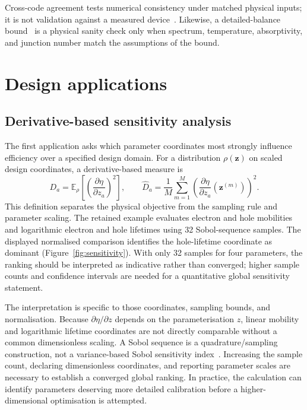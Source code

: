 
Cross-code agreement tests numerical consistency under matched physical
inputs; it is not validation against a measured
device~\cite{oberkampf2002}. Likewise, a
detailed-balance bound~\cite{shockley1961} is a physical sanity check only
when spectrum, temperature, absorptivity, and junction number match the
assumptions of the bound.

\section{Design applications}\label{sec:applications}
\subsection{Derivative-based sensitivity analysis}
The first application asks which parameter coordinates most strongly
influence efficiency over a specified design domain. For a distribution
$\rho(\boldsymbol z)$ on scaled design coordinates, a derivative-based
measure is~\cite{sobol2009}
\begin{equation}
D_a=\mathbb E_{\rho}\left[
\left(\frac{\partial\eta}{\partial z_a}\right)^2\right],\qquad
\widehat D_a=\frac{1}{M}\sum_{m=1}^{M}
\left(\frac{\partial\eta}{\partial z_a}(\boldsymbol z^{(m)})\right)^2.
\label{eq:dgsm}
\end{equation}
This definition separates the physical objective from the sampling rule
and parameter scaling. The retained example evaluates electron and hole
mobilities and logarithmic electron and hole lifetimes using 32
Sobol-sequence samples. The displayed normalised comparison identifies
the hole-lifetime coordinate as dominant (Figure~\ref{fig:sensitivity}).
With only 32 samples for four parameters, the ranking should be
interpreted as indicative rather than converged; higher sample counts
and confidence intervals are needed for a quantitative global
sensitivity statement.

The interpretation is specific to those coordinates, sampling bounds,
and normalisation. Because $\partial\eta/\partial z$ depends on the
parameterisation $z$, linear mobility and logarithmic lifetime
coordinates are not directly comparable without a common dimensionless
scaling. A Sobol sequence is a quadrature/sampling construction, not a
variance-based Sobol sensitivity index~\cite{scipysobol,sobol2009}.
Increasing the sample count, declaring dimensionless coordinates, and
reporting parameter scales are necessary to establish a converged global
ranking. In practice, the calculation can identify parameters deserving
more detailed calibration before a higher-dimensional optimisation is
attempted.

